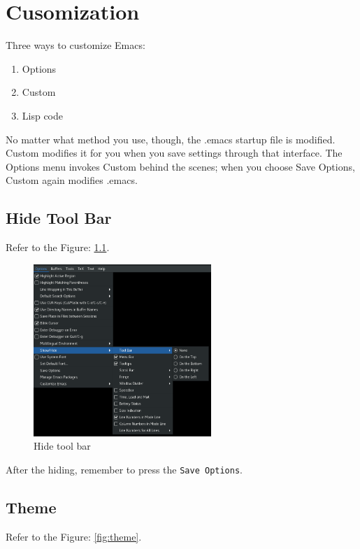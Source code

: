 \chapter{Cusomization}

Three ways to customize Emacs:
\begin{enumerate}
\item Options
\item Custom
\item Lisp code
\end{enumerate}

No matter what method you use, though, the .emacs startup file is modified.
Custom modifies it for you when you save settings through that interface.
The Options menu invokes Custom behind the scenes; when you choose Save Options, Custom again modifies .emacs.

\section{Hide Tool Bar}
Refer to the Figure: \ref{fig:hide-tool-bar}.

\begin{figure}[!ht]
  \label{fig:hide-tool-bar}
  \centering
  \includegraphics[width=0.6\textwidth]{hide-tool-bar.png}
  \caption{Hide tool bar}
\end{figure}

After the hiding, remember to press the \verb|Save Options|.
\clearpage


\section{Theme}
Refer to the Figure: \ref{fig:theme}.


